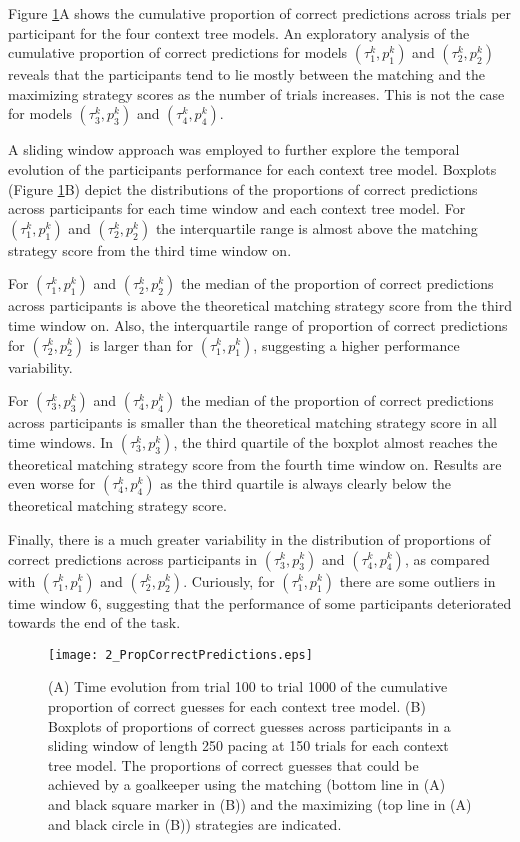 \documentclass[fleqn,10pt]{wlscirep}
\begin{document}
Figure \ref{fig:rawdata}A shows the cumulative proportion of correct predictions across trials per participant for the four context tree models. An exploratory analysis of the cumulative proportion of correct predictions for models $(\tau^k_1, p^k_1)$ and $(\tau^k_2, p^k_2)$ reveals that the participants tend to lie mostly between the matching and the maximizing strategy scores as the number of trials increases. This is not the case for models $(\tau^k_3, p^k_3)$ and $(\tau^k_4, p^k_4)$. 

A sliding window approach was employed to further explore the temporal evolution of the participants performance for each context tree model. Boxplots (Figure \ref{fig:rawdata}B) depict the distributions of the proportions of correct predictions across participants for each time window and each context tree model. For $(\tau^k_1, p^k_1)$ and $(\tau^k_2, p^k_2)$ the interquartile range is almost above the matching strategy score from the third time window on. 

For $(\tau^k_1, p^k_1)$ and $(\tau^k_2, p^k_2)$ the median of the proportion of correct predictions across participants is above the theoretical matching strategy score from the third time window on. Also, the interquartile range of proportion of correct predictions for $(\tau^k_2, p^k_2)$ is larger than for $(\tau^k_1, p^k_1)$, suggesting a higher performance variability. 

For $(\tau^k_3, p^k_3)$ and $(\tau^k_4, p^k_4)$ the median of the proportion of correct predictions across participants is smaller than the theoretical matching strategy score in all time windows. In $(\tau^k_3, p^k_3)$, the third quartile of the boxplot almost reaches the theoretical matching strategy score from the fourth time window on. Results are even worse for $(\tau^k_4, p^k_4)$ as the third quartile is always clearly below the theoretical matching strategy score. 

Finally, there is a much greater variability in the distribution of proportions of correct predictions across participants in $(\tau^k_3, p^k_3)$ and $(\tau^k_4, p^k_4)$, as compared with $(\tau^k_1, p^k_1)$ and $(\tau^k_2, p^k_2)$. Curiously, for $(\tau^k_1, p^k_1)$ there are some outliers in time window 6, suggesting that the performance of some participants deteriorated towards the end of the task.    

\begin{figure}[h!]
	\texttt{[image: 2\_PropCorrectPredictions.eps]}
	\caption{(A) Time evolution from trial 100 to trial 1000 of the cumulative proportion of correct guesses for each context tree model. (B) Boxplots of proportions of correct guesses across participants in a sliding window of length 250 pacing at 150 trials for each context tree model. The proportions of correct guesses that could be achieved by a goalkeeper using the matching (bottom line in (A) and black square marker in (B)) and the maximizing (top line in (A) and black circle in (B)) strategies are indicated.}
	\label{fig:rawdata}
\end{figure}
\FloatBarrier
\end{document}
